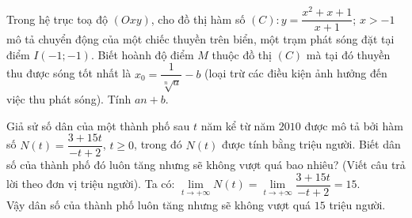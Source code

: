 \begin{bt}%

	Trong hệ trục toạ độ $(Oxy)$, cho đồ thị hàm số $(C)\colon y=\dfrac{x^2+x+1}{x+1}$; $x>-1$ mô tả chuyển động của một chiếc thuyền trên biển, một trạm phát sóng đặt tại điểm $I(-1;-1)$. Biết hoành độ điểm $M$ thuộc đồ thị $(C)$ mà tại đó thuyền thu được sóng tốt nhất là $x_0=\dfrac{1}{\sqrt[n]{a}}-b$ (loại trừ các điều kiện ảnh hưởng đến việc thu phát sóng). Tính $an+b$.
\end{bt}

\begin{bt}%
	Giả sử số dân của một thành phố sau $t$ năm kể từ năm $2010$ được mô tả bởi hàm số $N(t)=\dfrac{3+15t}{-t+2}$, $t\geq 0$, trong đó $N(t)$ được tính bằng triệu người. Biết dân số của thành phố đó luôn tăng nhưng sẽ không vượt quá bao nhiêu? (Viết câu trả lời theo đơn vị triệu người).
	\loigiai
	{Ta có: $\lim\limits_{t\to +\infty} N(t)=\lim\limits_{t\to +\infty}\dfrac{3+15t}{-t+2}=15$.\\
		Vậy dân số của thành phố luôn tăng nhưng sẽ không vượt quá $15$ triệu người.
	}
\end{bt}

